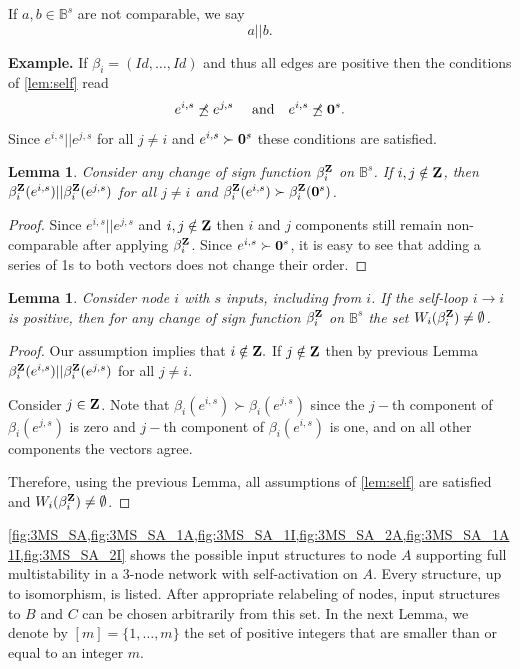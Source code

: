 \documentclass[12pt]{amsart}
\newcommand{\bZ}{{\bf Z}}
\newcommand{\bzero}{{\bf 0}}
\newcommand{\bbB}{\mathbb{B}}
\newtheorem{lem}[thm]{Lemma}
\theoremstyle{definition}
\begin{document}
If $a, b \in \bbB^s$ are not comparable, we say 
\[ a || b.\]

{\bf Example.} If $\beta_i=(Id, \ldots ,Id)$ and thus all edges are positive then the conditions of \cref{lem:self} read
\[ e^{i,s}\not \preceq  e^{j,s} \quad \mbox{ and} \quad e^{i,s} \not \preceq \bzero^s.\]
Since $e^{i,s} || e^{j,s}$ for all $j \not=i$ and $e^{i,s} \succ \bzero^s$ these conditions are satisfied.


 \begin{lem}
 Consider any change of sign function $\beta_i^{\bZ}$ on $\bbB^s$.
 If $i,j \notin \bZ$, then 
     $\beta_i^{\bZ}(e^{i,s}) || \beta_i^{\bZ}(e^{j,s})$ for all $j\not =i$ and 
     $\beta_i^{\bZ}(e^{i,s}) \succ \beta_i^{\bZ}(\bzero^s)$.
 \end{lem}
 \begin{proof}
    Since $e^{i,s} || e^{j,s}$ and $i,j \notin \bZ$ then $i$ and $j$ components still remain non-comparable after applying $\beta_i^\bZ$. Since $e^{i,s} \succ \bzero^s$, it is easy to see that adding a series of 1s to both vectors does not change their order. 
 \end{proof}

\begin{lem}\label{lem:pos_self}
Consider node $i$ with $s$ inputs, including from $i$. If the self-loop $i\to i$ is positive, then for any change of sign function $\beta_i^{\bZ}$ on $\bbB^s$ the set $W_i(\beta_i^{\bZ}) \not = \emptyset$.
\end{lem}
\begin{proof}
Our assumption implies that $i \notin \bZ.$ If $j \notin \bZ$ then by previous Lemma $\beta_i^{\bZ}(e^{i,s}) || \beta_i^{\bZ}(e^{j,s})$ for all $j\not =i$.

Consider $j \in \bZ$. Note that $\beta_i(e^{i,s}) \succ \beta_i(e^{j,s})$ since the $j-$th component of $\beta_i(e^{j,s})$ is zero and $j-$th component of $\beta_i(e^{i,s})$ is one, and on all other components the vectors agree.
  
Therefore, using the previous Lemma, all assumptions of \cref{lem:self} are satisfied and 
$W_i(\beta_i^{\bZ}) \not = \emptyset$.
\end{proof}

\cref{fig:3MS_SA,fig:3MS_SA_1A,fig:3MS_SA_1I,fig:3MS_SA_2A,fig:3MS_SA_1A1I,fig:3MS_SA_2I} shows the possible input structures to node $A$ supporting full multistability in a 3-node network with self-activation on $A$. Every structure, up to isomorphism, is listed. After appropriate relabeling of nodes, input structures to $B$ and $C$ can be chosen arbitrarily from this set.
In the next Lemma, we denote by $[m]=\{1, \ldots,m\}$ the set of positive integers that are smaller than or equal to an integer $m$.
\end{document}

